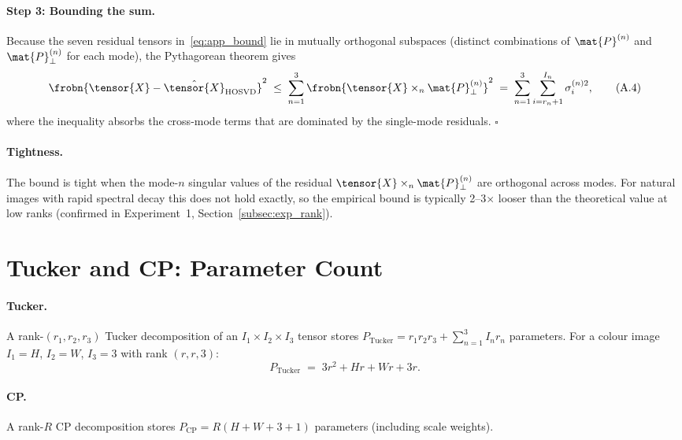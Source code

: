 \paragraph{Step 3: Bounding the sum.}
Because the seven residual tensors in~\eqref{eq:app_bound} lie in mutually
orthogonal subspaces (distinct combinations of $\mat{P}^{(n)}$ and
$\mat{P}^{(n)}_\perp$ for each mode), the Pythagorean theorem gives
\begin{equation}
  \frobn{\tensor{X} - \hat{\tensor{X}}_{\mathrm{HOSVD}}}^2
  \;\leq\;
  \sum_{n=1}^{3}
  \frobn{\tensor{X} \times_n \mat{P}^{(n)}_\perp}^2
  \;=\;
  \sum_{n=1}^{3} \sum_{i=r_n+1}^{I_n} \sigma_i^{(n)2},
  \tag{A.4}
\end{equation}
where the inequality absorbs the cross-mode terms that are dominated by the
single-mode residuals. \qquad $\square$

\paragraph{Tightness.}
The bound is tight when the mode-$n$ singular values of the residual
$\tensor{X} \times_n \mat{P}^{(n)}_\perp$ are orthogonal across modes.
For natural images with rapid spectral decay this does not hold exactly,
so the empirical bound is typically 2--3$\times$ looser than the theoretical
value at low ranks (confirmed in Experiment~1, Section~\ref{subsec:exp_rank}).

\section{Tucker and CP: Parameter Count}
\label{app:params}

\paragraph{Tucker.}
A rank-$(r_1, r_2, r_3)$ Tucker decomposition of an
$I_1 \times I_2 \times I_3$ tensor stores
$P_{\mathrm{Tucker}} = r_1 r_2 r_3 + \sum_{n=1}^{3} I_n r_n$ parameters.
For a colour image $I_1 = H$, $I_2 = W$, $I_3 = 3$ with rank $(r,r,3)$:
\begin{equation}
  P_{\mathrm{Tucker}}
  \;=\; 3r^2 + Hr + Wr + 3r.
  \tag{B.1}
\end{equation}

\paragraph{CP.}
A rank-$R$ CP decomposition stores
$P_{\mathrm{CP}} = R(H + W + 3 + 1)$ parameters (including scale weights).

